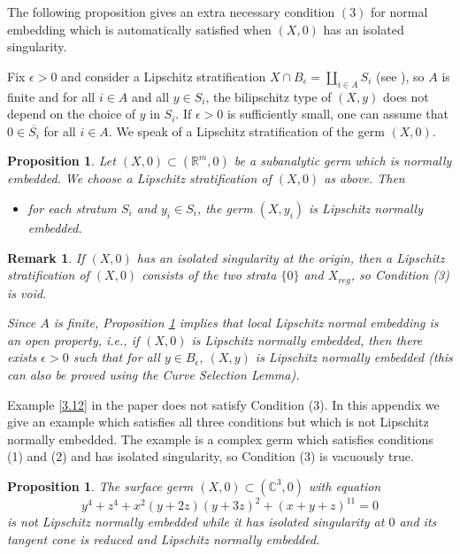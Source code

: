\documentclass{amsart}
\newtheorem{proposition}[theorem]{Proposition}
\newtheorem{remark}[theorem]{Remark}
\begin{document}
The following proposition gives an extra necessary condition $(3)$ for
normal embedding which is automatically satisfied when $(X,0)$ has an
isolated singularity.

Fix $\epsilon>0$ and consider a Lipschitz stratification  
$X \cap B_{\epsilon} = \coprod_{i \in A} S_{i}$    (see \cite{Mostowski,P}), so
$A$ is finite and for all $i \in A$ and all $y \in S_{i}$, the
bilipschitz type of $(X,y)$ does not depend on the choice of $y$ in
$S_{i}$. If $\epsilon >0$ is sufficiently small, one can assume that
$0 \in \overline{S_i}$ for all $i \in A$. We speak of a Lipschitz
stratification of the germ $(X,0)$.
 
\begin{proposition}\label{prop:extra condition} Let
  $(X,0) \subset (\mathbb R^m,0)$ be a subanalytic germ which is
  normally embedded. We choose a Lipschitz stratification of $(X,0)$
  as above. Then
\begin{itemize}
\item[(3)]for each stratum $S_i$ and $y_i \in S_i$, the germ $(X,y_i)$
  is Lipschitz normally embedded.
\end{itemize}
\end{proposition}

\begin{remark} 
  If $(X,0)$ has an isolated singularity at the origin, then a
  Lipschitz stratification of $(X,0)$ consists of the two strata
  $\{0\}$ and $X_{reg}$, so Condition (3) is void.

  Since $A$ is finite, Proposition \ref{prop:extra condition} implies
  that local Lipschitz normal embedding is an open property, i.e., if
  $(X,0)$ is  Lipschitz normally embedded, then there exists $\epsilon>0$ such
  that for all $y \in B_{\epsilon}$, $(X,y)$ is  Lipschitz normally embedded
  (this can also be proved using the Curve Selection Lemma).
\end{remark}

Example \ref{3.12} in the paper does not satisfy Condition (3).  In
this appendix we give an example which satisfies all three conditions
but which is not Lipschitz normally embedded. The example is a complex
germ which satisfies conditions (1) and (2) and has isolated
singularity, so Condition (3) is vacuously true.

\begin{proposition}\label{Example} The surface germ
  $(X,0) \subset (\mathbb C^3,0)$ with equation
  $$y^4 + z^4 + x^2(y+2z)(y+3z)^2 + (x+y+z)^{11} =0$$ is not Lipschitz
  normally embedded while it has isolated singularity at $0$ and its
  tangent cone is reduced and  Lipschitz normally embedded.
\end{proposition}
\end{document}
